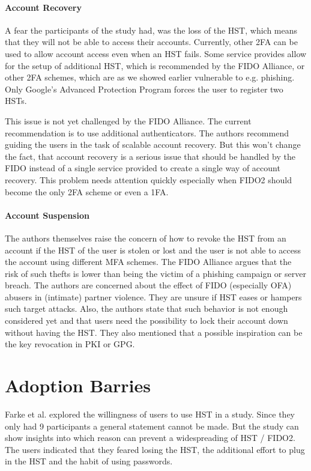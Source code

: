 \documentclass[runningheads]{llncs}
\begin{document}
\paragraph{Account Recovery}
A fear the participants of the study had, was the loss of the HST, which means that they will not be able to access their accounts. Currently, other 2FA can be used to allow account access even when an HST fails. Some service provides allow for the setup of additional HST, which is recommended by the FIDO Alliance, or other 2FA schemes, which are as we showed earlier vulnerable to e.g. phishing. Only Google's Advanced Protection Program forces the user to register two HSTs.

This issue is not yet challenged by the FIDO Alliance. The current recommendation is to use additional authenticators. The authors recommend guiding the users in the task of scalable account recovery. But this won't change the fact, that account recovery is a serious issue that should be handled by the FIDO instead of a single service provided to create a single way of account recovery. This problem needs attention quickly especially when FIDO2 should become the only 2FA scheme or even a 1FA. 

\paragraph{Account Suspension}
The authors themselves raise the concern of how to revoke the HST from an account if the HST of the user is stolen or lost and the user is not able to access the account using different MFA schemes. The FIDO Alliance argues that the risk of such thefts is lower than being the victim of a phishing campaign or server breach. The authors are concerned about the effect of FIDO (especially OFA) abusers in (intimate) partner violence. They are unsure if HST eases or hampers such target attacks. Also, the authors state that such behavior is not enough considered yet and that users need the possibility to lock their account down without having the HST. They also mentioned that a possible inspiration can be the key revocation in PKI or GPG.

\section{Adoption Barries}
Farke et al. explored the willingness of users to use HST in a study. Since they only had 9 participants a general statement cannot be made. But the study can show insights into which reason can prevent a widespreading of HST / FIDO2. The users indicated that they feared losing the HST, the additional effort to plug in the HST and the habit of using passwords.
\end{document}
